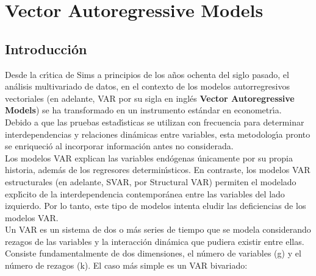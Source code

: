 
\section{Vector Autoregressive Models}
\subsection{Introducci\'on}
		Desde la cr\'{\i}tica de Sims \cite{sims1980macroeconomics} a principios de los años ochenta del siglo pasado, el an\'alisis multivariado de datos, en el contexto de los modelos autorregresivos vectoriales (en adelante, VAR por su sigla en ingl\'es  \textbf{Vector Autoregressive Models}) se ha transformado en un instrumento est\'andar en econometr\'{\i}a. \\
		Debido a que las pruebas estad\'{\i}sticas se utilizan con frecuencia para determinar interdependencias y relaciones din\'amicas entre variables, esta metodolog\'{\i}a pronto se enriqueci\'o al incorporar información antes no considerada.\\	
		Los modelos VAR explican las variables end\'ogenas \'unicamente por su propia historia, adem\'as de los regresores determin\'{\i}sticos. En contraste, los modelos VAR estructurales (en adelante, SVAR, por Structural VAR) permiten el modelado expl\'{\i}cito de la interdependencia contempor\'anea entre las variables del lado izquierdo. Por lo tanto, este tipo de modelos intenta eludir las deficiencias de los modelos VAR.\\
		Un VAR es un sistema de dos o m\'as series de tiempo que se modela considerando rezagos de las variables y la interacción din\'amica que pudiera existir entre ellas. Consiste fundamentalmente de dos dimensiones, el n\'umero de variables (g) y el n\'umero de rezagos (k). El caso más simple es un VAR bivariado:
		
